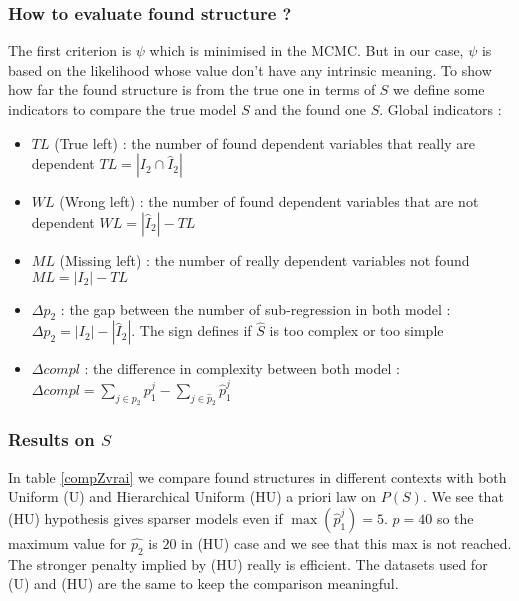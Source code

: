 \documentclass[11pt,a4paper]{article}
\begin{document}
		\subsubsection{How to evaluate found structure ?}
			The first criterion is $\psi$ which is minimised in the MCMC. But in our case, $\psi$ is based on the likelihood whose value don't have any intrinsic meaning. To show how far the found structure is from the true one in terms of $S$ we define some indicators to compare the true model $S$ and the found one $\hat{S}$.
			Global indicators :
			\begin{itemize}
				\item $TL$ (True left) : the number of found dependent variables that really are dependent $TL=|I_2\cap \hat{I}_2|$ 
				\item $WL$ (Wrong left) : the number of found dependent variables that are not dependent $WL=|\hat{I}_2|-TL$
				\item $ML$ (Missing left) : the number of really dependent variables not found $ML=|I_2|-TL$
				\item $\Delta p_2$ : the gap between the number of sub-regression in both model : $\Delta p_2=|I_2|-|\hat{I}_2|$. The sign defines if $\hat{S}$ is too complex or too simple
				\item $\Delta compl$ : the difference in complexity between both model : $\Delta compl=\sum_{j \in p_2}p_1^j-\sum_{j \in \hat{p}_2}\hat{p}_1^j$
			\end{itemize}
		\subsubsection{Results on $S$}	\label{compZ}
In table \ref{compZvrai} we compare found structures in different contexts with both Uniform (U) and Hierarchical Uniform (HU) a priori law on $P(S)$. 
We see that (HU) hypothesis gives sparser models even if $\max (\hat{p}_1^j)=5$. $p=40$ so the maximum value for $\hat{p_2}$ is $20$ in (HU) case and we see that this max is not reached. The stronger penalty implied by (HU) really is efficient. The datasets used for (U) and (HU) are the same to keep the comparison  meaningful.
 
\end{document}
